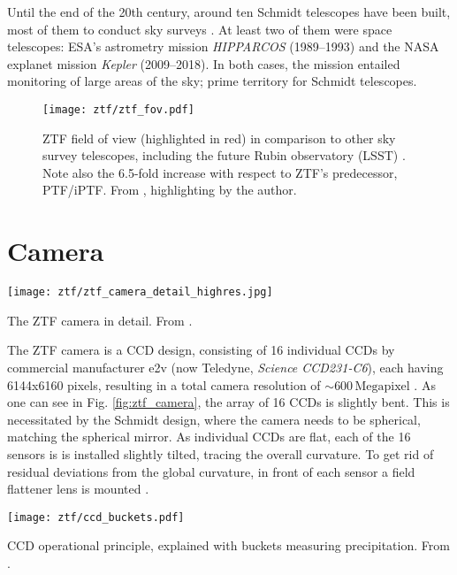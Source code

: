 Until the end of the 20th century, around ten Schmidt telescopes have been built, most of them to conduct sky surveys . At least two of them were space telescopes: ESA's astrometry mission \textit{HIPPARCOS}  (1989--1993) and the NASA explanet mission \textit{Kepler}  (2009--2018). In both cases, the mission entailed monitoring of large areas of the sky; prime territory for Schmidt telescopes.

\begin{figure}[]
    \texttt{[image: ztf/ztf\_fov.pdf]}
    \caption[ZTF Field of View]{ZTF field of view (highlighted in red) in comparison to other sky survey telescopes, including the future Rubin observatory (LSST) \cite{Ivezic2019}. Note also the 6.5-fold increase with respect to ZTF's predecessor, PTF/iPTF. From \cite{Laher2018}, highlighting by the author.}
\end{figure}



\section{Camera}
\begin{marginfigure}
    \texttt{[image: ztf/ztf\_camera\_detail\_highres.jpg]}
    \caption[ZTF camera cutaway]{The ZTF camera in detail. From \cite{Dekany2020}.}
\end{marginfigure}
The ZTF camera is a CCD design, consisting of 16 individual CCDs by commercial manufacturer e2v (now Teledyne, \textit{Science CCD231-C6}), each having 6144x6160 pixels, resulting in a total camera resolution of $\sim 600 \,\textrm{Megapixel}$ . As one can see in Fig. \ref{fig:ztf_camera}, the array of 16 CCDs is slightly bent. This is necessitated by the Schmidt design, where the camera needs to be spherical, matching the spherical mirror. As individual CCDs are flat, each of the 16 sensors is is installed slightly tilted, tracing the overall curvature. To get rid of residual deviations from the global curvature, in front of each sensor a field flattener lens is mounted .

\begin{marginfigure}
    \texttt{[image: ztf/ccd\_buckets.pdf]}
    \caption[CCD operational principle]{CCD operational principle, explained with buckets measuring precipitation. From \cite{Janesick1987}.}
\end{marginfigure}

